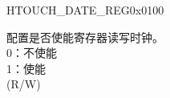 \begin{register}{H}{TOUCH\_DATE\_REG}{0x0100}\label{regdesc:TOUCHDATEREG}
%
%
\regnewline%
\begin{regdesc}\begin{reglist}
\label{fielddesc:TOUCHCLKEN}\item [TOUCH\_CLK\_EN] 配置是否使能寄存器读写时钟。\\
0：不使能\\
1：使能\\
(R/W)
\end{reglist}\end{regdesc}
\end{register}

